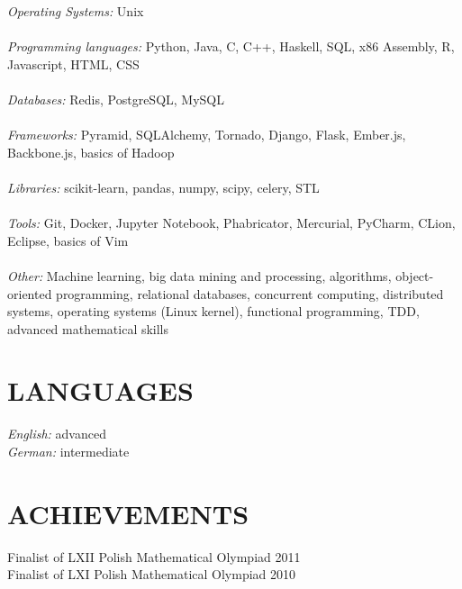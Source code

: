 \documentclass[margin, 10pt]{res} %
\begin{document}
\begin{resume}
{\sl Operating Systems:} Unix \\ \\
{\sl Programming languages:}
Python, Java, C, C++, Haskell, SQL, x86 Assembly, R, Javascript, HTML, CSS \\ \\
{\sl Databases:} Redis, PostgreSQL, MySQL \\ \\
{\sl Frameworks:} Pyramid, SQLAlchemy, Tornado, Django, Flask, Ember.js, Backbone.js, basics of Hadoop \\ \\
{\sl Libraries:} scikit-learn, pandas, numpy, scipy, celery, STL \\ \\
{\sl Tools:} Git, Docker, Jupyter Notebook, Phabricator, Mercurial, PyCharm, CLion, Eclipse, basics of Vim \\ \\
{\sl Other:} Machine learning, big data mining and processing, algorithms, object-oriented programming, relational databases, concurrent computing, distributed systems, operating systems (Linux kernel), functional programming, TDD, advanced mathematical skills


\section{ LANGUAGES } 

{\sl English:} advanced \\
{\sl German:} intermediate



\section{ ACHIEVEMENTS } 

Finalist of LXII Polish Mathematical Olympiad \hfill 2011 \\
Finalist of LXI Polish Mathematical Olympiad \hfill 2010


\end{resume}
\end{document}
